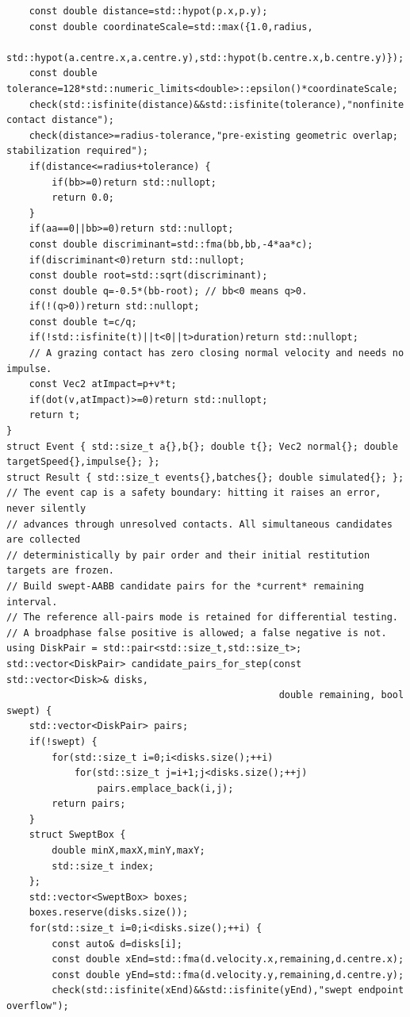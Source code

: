 \begin{verbatim}
    const double distance=std::hypot(p.x,p.y);
    const double coordinateScale=std::max({1.0,radius,
        std::hypot(a.centre.x,a.centre.y),std::hypot(b.centre.x,b.centre.y)});
    const double tolerance=128*std::numeric_limits<double>::epsilon()*coordinateScale;
    check(std::isfinite(distance)&&std::isfinite(tolerance),"nonfinite contact distance");
    check(distance>=radius-tolerance,"pre-existing geometric overlap; stabilization required");
    if(distance<=radius+tolerance) {
        if(bb>=0)return std::nullopt;
        return 0.0;
    }
    if(aa==0||bb>=0)return std::nullopt;
    const double discriminant=std::fma(bb,bb,-4*aa*c);
    if(discriminant<0)return std::nullopt;
    const double root=std::sqrt(discriminant);
    const double q=-0.5*(bb-root); // bb<0 means q>0.
    if(!(q>0))return std::nullopt;
    const double t=c/q;
    if(!std::isfinite(t)||t<0||t>duration)return std::nullopt;
    // A grazing contact has zero closing normal velocity and needs no impulse.
    const Vec2 atImpact=p+v*t;
    if(dot(v,atImpact)>=0)return std::nullopt;
    return t;
}
struct Event { std::size_t a{},b{}; double t{}; Vec2 normal{}; double targetSpeed{},impulse{}; };
struct Result { std::size_t events{},batches{}; double simulated{}; };
// The event cap is a safety boundary: hitting it raises an error, never silently
// advances through unresolved contacts. All simultaneous candidates are collected
// deterministically by pair order and their initial restitution targets are frozen.
// Build swept-AABB candidate pairs for the *current* remaining interval.
// The reference all-pairs mode is retained for differential testing.
// A broadphase false positive is allowed; a false negative is not.
using DiskPair = std::pair<std::size_t,std::size_t>;
std::vector<DiskPair> candidate_pairs_for_step(const std::vector<Disk>& disks,
                                                double remaining, bool swept) {
    std::vector<DiskPair> pairs;
    if(!swept) {
        for(std::size_t i=0;i<disks.size();++i)
            for(std::size_t j=i+1;j<disks.size();++j)
                pairs.emplace_back(i,j);
        return pairs;
    }
    struct SweptBox {
        double minX,maxX,minY,maxY;
        std::size_t index;
    };
    std::vector<SweptBox> boxes;
    boxes.reserve(disks.size());
    for(std::size_t i=0;i<disks.size();++i) {
        const auto& d=disks[i];
        const double xEnd=std::fma(d.velocity.x,remaining,d.centre.x);
        const double yEnd=std::fma(d.velocity.y,remaining,d.centre.y);
        check(std::isfinite(xEnd)&&std::isfinite(yEnd),"swept endpoint overflow");

\end{verbatim}
